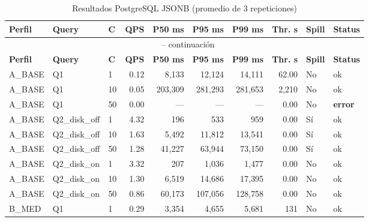 \documentclass[12pt,a4paper]{article}
\begin{document}
\begin{longtable}{lllrrrrrll}
\caption{Resultados PostgreSQL JSONB (promedio de 3 repeticiones)} \label{tab:postgresql} \\
\toprule
\textbf{Perfil} & \textbf{Query} & \textbf{C} & \textbf{QPS} & \textbf{P50 ms} & \textbf{P95 ms} & \textbf{P99 ms} & \textbf{Thr. s} & \textbf{Spill} & \textbf{Status} \\
\midrule
\endfirsthead
\multicolumn{10}{c}{\tablename\ \thetable{} -- continuación} \\
\toprule
\textbf{Perfil} & \textbf{Query} & \textbf{C} & \textbf{QPS} & \textbf{P50 ms} & \textbf{P95 ms} & \textbf{P99 ms} & \textbf{Thr. s} & \textbf{Spill} & \textbf{Status} \\
\midrule
\endhead
\bottomrule
\endfoot
\rowcolor{gray!8}
A\_BASE & Q1            & 1  & 0.12 & 8{,}133    & 12{,}124  & 14{,}111  & 62.00   & No  & \textcolor{green!60!black}{ok} \\
\rowcolor{gray!8}
A\_BASE & Q1            & 10 & 0.05 & 203{,}309  & 281{,}293 & 281{,}653 & 2{,}210 & No  & \textcolor{green!60!black}{ok} \\
\rowcolor{errbg}
A\_BASE & Q1            & 50 & 0.00 & ---        & ---       & ---       & 0.00    & No  & \textcolor{alertred}{\textbf{error}} \\
A\_BASE & Q2\_disk\_off & 1  & 4.32 & 196        & 533       & 959       & 0.00    & \textcolor{alertred}{Sí} & \textcolor{green!60!black}{ok} \\
A\_BASE & Q2\_disk\_off & 10 & 1.63 & 5{,}492    & 11{,}812  & 13{,}541  & 0.00    & \textcolor{alertred}{Sí} & \textcolor{green!60!black}{ok} \\
A\_BASE & Q2\_disk\_off & 50 & 1.28 & 41{,}227   & 63{,}944  & 73{,}150  & 0.00    & \textcolor{alertred}{Sí} & \textcolor{green!60!black}{ok} \\
A\_BASE & Q2\_disk\_on  & 1  & 3.32 & 207        & 1{,}036   & 1{,}477   & 0.00    & No  & \textcolor{green!60!black}{ok} \\
A\_BASE & Q2\_disk\_on  & 10 & 1.30 & 6{,}519    & 14{,}686  & 17{,}395  & 0.00    & No  & \textcolor{green!60!black}{ok} \\
A\_BASE & Q2\_disk\_on  & 50 & 0.86 & 60{,}173   & 107{,}056 & 128{,}758 & 0.00    & No  & \textcolor{green!60!black}{ok} \\
\midrule
\rowcolor{warnbg}
B\_MED  & Q1            & 1  & 0.29 & 3{,}354    & 4{,}655   & 5{,}681   & 131     & No  & \textcolor{green!60!black}{ok} \\

\end{longtable}
\end{document}
